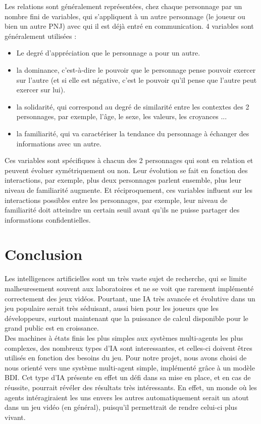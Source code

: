 \documentclass[asi]{picINSAIA}
\begin{document}
Les relations sont généralement représentées, chez chaque personnage par un nombre fini de variables, qui s’appliquent à un autre personnage (le joueur ou bien un autre PNJ) avec qui il est déjà entré en communication. 4 variables sont généralement utilisées :
\begin{itemize}
\item Le degré d'appréciation que le personnage a pour un autre.
\item la dominance, c'est-à-dire le pouvoir que le personnage pense pouvoir exercer sur l'autre (et si elle est négative, c'est le pouvoir qu'il pense que l'autre peut exercer sur lui).
\item la solidarité, qui correspond au degré de similarité entre les contextes des 2 personnages, par exemple, l'âge, le sexe, les valeurs, les croyances ...
\item la familiarité, qui va caractériser la tendance du personnage à échanger des informations avec un autre.
\end{itemize}
Ces variables sont spécifiques à chacun des 2 personnages qui sont en relation et peuvent évoluer symétriquement ou non. Leur évolution se fait en fonction des interactions, par exemple, plus deux personnages parlent ensemble, plus leur niveau de familiarité augmente. Et réciproquement, ces variables influent sur les interactions possibles entre les personnages, par exemple, leur niveau de familiarité doit atteindre un certain seuil avant qu'ils ne puisse partager des informations confidentielles. 


\chapter{Conclusion}
Les intelligences artificielles sont un très vaste sujet de recherche, qui se limite malheuresement souvent aux laboratoires et ne se voit que rarement implémenté correctement des jeux vidéos. Pourtant, une IA très avancée et évolutive dans un jeu populaire serait très séduisant, aussi bien pour les joueurs que les développeurs, surtout maintenant que la puissance de calcul disponible pour le grand public est en croissance.\\

Des machines à états finis les plus simples aux systèmes multi-agents les plus complexes, des nombreux types d'IA sont interessantes, et celles-ci doivent êtres utilisés en fonction des besoins du jeu.
Pour notre projet, nous avons choisi de nous orienté vers une système multi-agent simple, implémenté grâce à un modèle BDI.
Cet type d'IA présente en effet un défi dans sa mise en place, et en cas de réussite, pourrait révéler des résultats très intéressants.
En effet, un monde où les agents intéragiraient les uns envers les autres automatiquement serait un atout dans un jeu vidéo (en général), puisqu'il permettrait de rendre celui-ci plus vivant.
\end{document}
